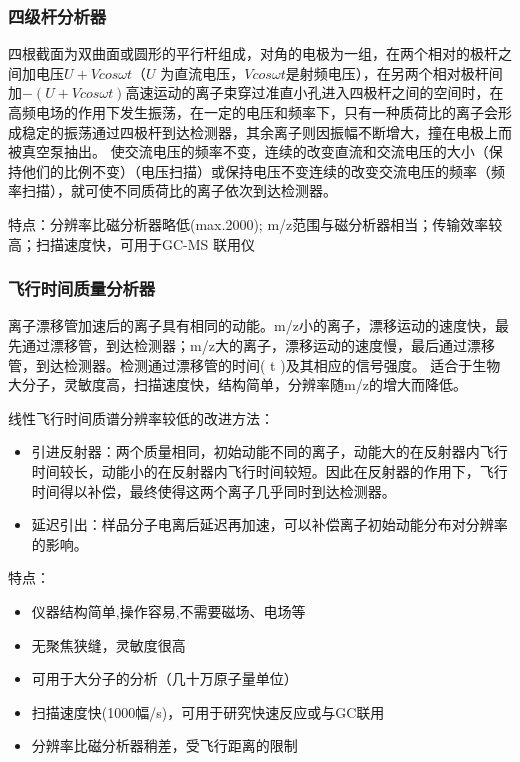 \subsubsection*{四级杆分析器}
四根截面为双曲面或圆形的平行杆组成，对角的电极为一组，在两个相对的极杆之间加电压$U+Vcos\omega t$（$U$ 为直流电压，$Vcos\omega t$是射频电压），在另两个相对极杆间加$-(U+Vcos\omega t)$高速运动的离子束穿过准直小孔进入四极杆之间的空间时，在高频电场的作用下发生振荡，在一定的电压和频率下，只有一种质荷比的离子会形成稳定的振荡通过四极杆到达检测器，其余离子则因振幅不断增大，撞在电极上而被真空泵抽出。 使交流电压的频率不变，连续的改变直流和交流电压的大小（保持他们的比例不变）（电压扫描）或保持电压不变连续的改变交流电压的频率（频率扫描），就可使不同质荷比的离子依次到达检测器。

特点：分辨率比磁分析器略低(max.2000); m/z范围与磁分析器相当；传输效率较高；扫描速度快，可用于GC-MS 联用仪

\subsubsection*{飞行时间质量分析器}
离子漂移管加速后的离子具有相同的动能。m/z小的离子，漂移运动的速度快，最先通过漂移管，到达检测器；m/z大的离子，漂移运动的速度慢，最后通过漂移管，到达检测器。检测通过漂移管的时间( t )及其相应的信号强度。
适合于生物大分子，灵敏度高，扫描速度快，结构简单，分辨率随m/z的增大而降低。

线性飞行时间质谱分辨率较低的改进方法： 
\begin{itemize}
    \item  引进反射器：两个质量相同，初始动能不同的离子，动能大的在反射器内飞行时间较长，动能小的在反射器内飞行时间较短。因此在反射器的作用下，飞行时间得以补偿，最终使得这两个离子几乎同时到达检测器。
    \item 延迟引出：样品分子电离后延迟再加速，可以补偿离子初始动能分布对分辨率的影响。
\end{itemize}

特点：
\begin{itemize}
    \item 仪器结构简单,操作容易,不需要磁场、电场等
    \item 无聚焦狭缝，灵敏度很高
    \item 可用于大分子的分析（几十万原子量单位）
    \item 扫描速度快(1000幅/s)，可用于研究快速反应或与GC联用
    \item 分辨率比磁分析器稍差，受飞行距离的限制
\end{itemize}

